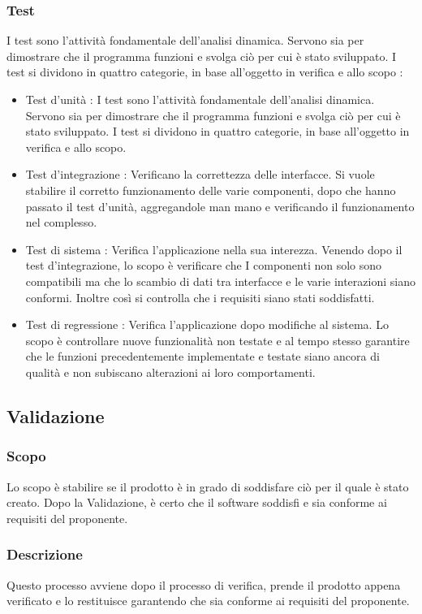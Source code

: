 \subsubsection{Test}
I test sono l’attività fondamentale dell’analisi dinamica. Servono sia per dimostrare che il programma funzioni e svolga ciò per cui è stato sviluppato. I test si dividono in quattro categorie, in base all’oggetto in verifica e allo scopo : 
\begin{itemize}
\item Test d’unità : I test sono l’attività fondamentale dell’analisi dinamica. Servono sia per dimostrare che il programma funzioni e svolga ciò per cui è stato sviluppato. I test si dividono in quattro categorie, in base all’oggetto in verifica e allo scopo.
\item Test d’integrazione : Verificano la correttezza delle interfacce. Si vuole stabilire il corretto funzionamento delle varie componenti, dopo che hanno passato il test d’unità, aggregandole man mano e verificando il funzionamento nel complesso.
\item Test di sistema : Verifica l’applicazione nella sua interezza. Venendo dopo il test d’integrazione, lo scopo è verificare che I componenti non solo sono compatibili ma che lo scambio di dati tra interfacce e le varie interazioni siano conformi. Inoltre così si controlla che i requisiti siano stati soddisfatti.
\item Test di regressione : Verifica l’applicazione dopo modifiche al sistema. Lo scopo è controllare nuove funzionalità non testate e al tempo stesso garantire che le funzioni precedentemente implementate e testate siano ancora di qualità e non subiscano alterazioni ai loro comportamenti.
\end{itemize}

\subsection{Validazione}
\subsubsection{Scopo}
Lo scopo è stabilire se il prodotto è in grado di soddisfare ciò per il quale è stato creato. Dopo la Validazione, è certo che il software soddisfi e sia conforme ai requisiti del proponente.

\subsubsection{Descrizione}
Questo processo avviene dopo il processo di verifica, prende il prodotto appena verificato e lo restituisce garantendo che sia conforme ai requisiti del proponente.

